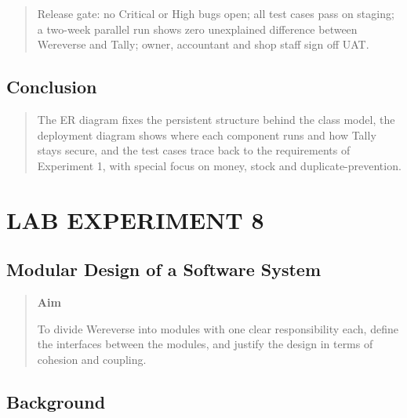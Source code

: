 \documentclass[12pt,a4paper]{article}
\begin{document}
\begin{quote}
Release gate: no Critical or High bugs open; all test cases pass on
staging; a two-week parallel run shows zero unexplained difference
between Wereverse and Tally; owner, accountant and shop staff sign off
UAT.
\end{quote}

\subsection{Conclusion}\label{conclusion-6}

\begin{quote}
The ER diagram fixes the persistent structure behind the class model,
the deployment diagram shows where each component runs and how Tally
stays secure, and the test cases trace back to the requirements of
Experiment 1, with special focus on money, stock and
duplicate-prevention.
\end{quote}

\clearpage
\section{LAB EXPERIMENT 8}\label{lab-experiment-8}

\subsection{Modular Design of a Software
System}\label{modular-design-of-a-software-system}

\begin{quote}
\textbf{Aim}

To divide Wereverse into modules with one clear responsibility each,
define the interfaces between the modules, and justify the design in
terms of cohesion and coupling.
\end{quote}

\subsection{Background}\label{background}
\end{document}
